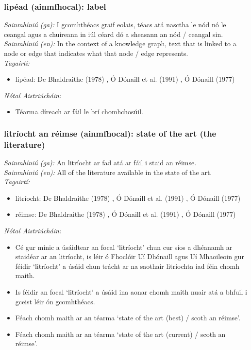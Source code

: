 \subsubsection*{lipéad (ainmfhocal): label}
 \noindent \textit{Sainmhíniú (ga):} I gcomhthéacs graif eolais, téacs atá nasctha le nód nó le ceangal agus a chuireann in iúl céard dó a sheasann an nód / ceangal sin.
\\
 \noindent \textit{Sainmhíniú (en):} In the context of a knowledge graph, text that is linked to a node or edge that indicates what that node / edge represents.
\\
 \noindent \textit{Tagairtí:}
\begin{itemize}
	\item lipéad: De Bhaldraithe (1978) \cite{de-bhaldraithe}, Ó Dónaill et al. (1991) \cite{focloir-beag}, Ó Dónaill (1977) \cite{odonaill}
\end{itemize}

 \noindent \textit{Nótaí Aistriúcháin:}
\begin{itemize}
	\item Téarma díreach ar fáil le brí chomhchosúil.
\end{itemize}


\subsubsection*{litríocht an réimse (ainmfhocal): state of the art (the literature)}
 \noindent \textit{Sainmhíniú (ga):} An litríocht ar fad atá ar fáil i staid an réimse.
\\
 \noindent \textit{Sainmhíniú (en):} All of the literature available in the state of the art.
\\
 \noindent \textit{Tagairtí:}
\begin{itemize}
	\item litríocht: De Bhaldraithe (1978) \cite{de-bhaldraithe}, Ó Dónaill et al. (1991) \cite{focloir-beag}, Ó Dónaill (1977) \cite{odonaill}
	\item réimse: De Bhaldraithe (1978) \cite{de-bhaldraithe}, Ó Dónaill et al. (1991) \cite{focloir-beag}, Ó Dónaill (1977) \cite{odonaill}
\end{itemize}

 \noindent \textit{Nótaí Aistriúcháin:}
\begin{itemize}
	\item Cé gur minic a úsáidtear an focal `litríocht' chun cur síos a dhéanamh ar staidéar ar an litríocht, is léir ó Fhoclóir Uí Dhónaill agus Uí Mhaoileoin gur féidir `litríocht' a úsáid chun trácht ar na saothair litríochta iad féin chomh maith.
	\item Is féidir an focal `litríocht' a úsáid ina aonar chomh maith nuair atá a bhfuil i gceist léir ón gcomhthéacs.
	\item Féach chomh maith ar an téarma `state of the art (best) / scoth an réimse'.
	\item Féach chomh maith ar an téarma `state of the art (current) / scoth an réimse'.
\end{itemize}


